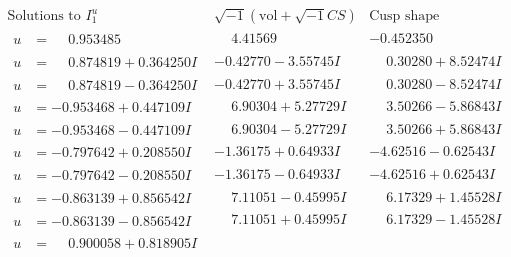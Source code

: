 \documentclass[1p]{elsarticle_modified}
\theoremstyle{definition}
\newcommand{\I}{\sqrt{-1}}
\begin{document}
$$\begin{array}{c|c|c}  
\text{Solutions to }I^u_{1}& \I (\text{vol} + \sqrt{-1}CS) & \text{Cusp shape}\\
 \hline 
\begin{aligned}
u &= \phantom{-}0.953485\phantom{ +0.000000I}\end{aligned}
 & \phantom{-}4.41569\phantom{ +0.000000I} & -0.452350\phantom{ +0.000000I} \\ \hline\begin{aligned}
u &= \phantom{-}0.874819 + 0.364250 I\end{aligned}
 & -0.42770 - 3.55745 I & \phantom{-}0.30280 + 8.52474 I \\ \hline\begin{aligned}
u &= \phantom{-}0.874819 - 0.364250 I\end{aligned}
 & -0.42770 + 3.55745 I & \phantom{-}0.30280 - 8.52474 I \\ \hline\begin{aligned}
u &= -0.953468 + 0.447109 I\end{aligned}
 & \phantom{-}6.90304 + 5.27729 I & \phantom{-}3.50266 - 5.86843 I \\ \hline\begin{aligned}
u &= -0.953468 - 0.447109 I\end{aligned}
 & \phantom{-}6.90304 - 5.27729 I & \phantom{-}3.50266 + 5.86843 I \\ \hline\begin{aligned}
u &= -0.797642 + 0.208550 I\end{aligned}
 & -1.36175 + 0.64933 I & -4.62516 - 0.62543 I \\ \hline\begin{aligned}
u &= -0.797642 - 0.208550 I\end{aligned}
 & -1.36175 - 0.64933 I & -4.62516 + 0.62543 I \\ \hline\begin{aligned}
u &= -0.863139 + 0.856542 I\end{aligned}
 & \phantom{-}7.11051 - 0.45995 I & \phantom{-}6.17329 + 1.45528 I \\ \hline\begin{aligned}
u &= -0.863139 - 0.856542 I\end{aligned}
 & \phantom{-}7.11051 + 0.45995 I & \phantom{-}6.17329 - 1.45528 I \\ \hline\begin{aligned}
u &= \phantom{-}0.900058 + 0.818905 I\end{aligned}

\end{array}$$
\end{document}
